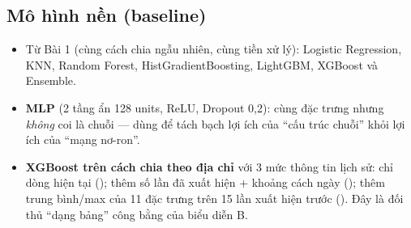 \subsection{Mô hình nền (baseline)}
\begin{itemize}
\item Từ Bài 1 (cùng cách chia ngẫu nhiên, cùng tiền xử lý): Logistic Regression, KNN, Random Forest, HistGradientBoosting,
  LightGBM, XGBoost và Ensemble.
\item \textbf{MLP} (2 tầng ẩn 128 units, ReLU, Dropout 0,2): cùng đặc trưng nhưng \emph{không} coi là chuỗi --- dùng để tách bạch
  lợi ích của ``cấu trúc chuỗi'' khỏi lợi ích của ``mạng nơ-ron''.
\item \textbf{XGBoost trên cách chia theo địa chỉ} với 3 mức thông tin lịch sử: chỉ dòng hiện tại (); thêm
  số lần đã xuất hiện + khoảng cách ngày (); thêm trung bình/max của 11 đặc trưng trên 15 lần xuất hiện trước
  (). Đây là đối thủ ``dạng bảng'' công bằng của biểu diễn B.
\end{itemize}
